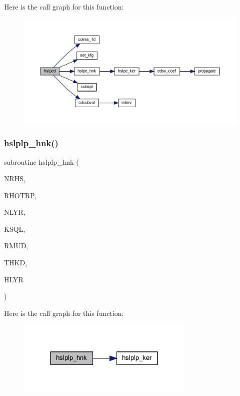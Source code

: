 Here is the call graph for this function\+:\nopagebreak
\begin{figure}[H]
\begin{center}
\leavevmode
\includegraphics[width=350pt]{Leroi__c_8f90_a1965f18ad74a78ddcda474fa4268445f_cgraph}
\end{center}
\end{figure}
\mbox{\label{Leroi__c_8f90_a9418379c5cb3a81d71a2a66746f839da}} 
\subsubsection{\texorpdfstring{hslplp\+\_\+hnk()}{hslplp\_hnk()}}
{\footnotesize\ttfamily subroutine hslplp\+\_\+hnk (\begin{DoxyParamCaption}\item[{integer}]{N\+R\+HS,  }\item[{real, dimension(nrhs)}]{R\+H\+O\+T\+RP,  }\item[{integer}]{N\+L\+YR,  }\item[{complex(kind=ql), dimension(nlyr)}]{K\+S\+QL,  }\item[{real(kind=ql), dimension(0\+:nlyr)}]{R\+M\+UD,  }\item[{real(kind=ql), dimension(nlyr)}]{T\+H\+KD,  }\item[{complex, dimension(nrhs)}]{H\+L\+YR }\end{DoxyParamCaption})}

Here is the call graph for this function\+:\nopagebreak
\begin{figure}[H]
\begin{center}
\leavevmode
\includegraphics[width=240pt]{Leroi__c_8f90_a9418379c5cb3a81d71a2a66746f839da_cgraph}
\end{center}
\end{figure}
\mbox{\label{Leroi__c_8f90_a6a948de64e256424bee5e99021fa129c}} 
